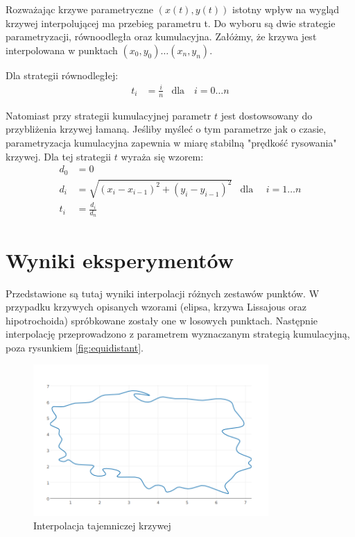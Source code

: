 \documentclass[11pt,wide]{mwart}
\begin{document}
Rozważając krzywe parametryczne $ (x(t), y(t)) $ istotny wpływ na wygląd krzywej interpolującej ma przebieg parametru t. Do wyboru są dwie strategie parametryzacji, równoodległa oraz kumulacyjna. Załóżmy, że krzywa jest interpolowana w punktach $ (x_0, y_0) \ldots (x_n, y_n) $. 

Dla strategii równodległej:
\begin{align}
	t_i &= \frac{i}{n} & \text{dla} \quad i = 0 \ldots n
\end{align}

Natomiast przy strategii kumulacyjnej parametr $ t $ jest dostowsowany do przybliżenia krzywej łamaną. Jeśliby myśleć o tym parametrze jak o czasie, parametryzacja kumulacyjna zapewnia w miarę stabilną "prędkość rysowania" krzywej. Dla tej strategii $ t $ wyraża się wzorem:
\begin{align}
	d_0 &= 0 \\
	d_i &= \sqrt{(x_i - x_{i-1})^2 + (y_i - y_{i-1})^2} & \text{dla } \quad i = 1 \ldots n \\
	t_i &= \frac{d_i}{d_n}
\end{align}

\section{Wyniki eksperymentów}

Przedstawione są tutaj wyniki interpolacji różnych zestawów punktów. W przypadku krzywych opisanych wzorami (elipsa, krzywa Lissajous oraz hipotrochoida) spróbkowane zostały one w losowych punktach. Następnie interpolację przeprowadzono z parametrem wyznaczanym strategią kumulacyjną, poza rysunkiem \ref{fig:equidistant}. 

\begin{figure}[h]
    \centering
    \includegraphics[width=0.8\textwidth]{poland}
    \caption{Interpolacja tajemniczej krzywej}
    \label{fig:poland}
\end{figure}
\end{document}
